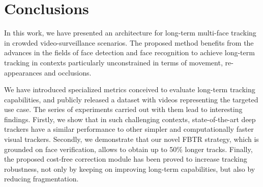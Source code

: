 \section{Conclusions}

In this work, we have presented an architecture for long-term multi-face tracking in crowded video-surveillance scenarios. The proposed method benefits from the advances in the fields of face detection and face recognition to achieve long-term tracking in contexts particularly unconstrained in terms of movement, re-appearances and occlusions. 

We have introduced specialized metrics conceived to evaluate long-term tracking capabilities, and publicly released a dataset with videos representing the targeted use case. The series of experiments carried out with them lead to interesting findings. Firstly, we show that in such challenging contexts, state-of-the-art deep trackers have a similar performance to other simpler and computationally faster visual trackers. Secondly, we demonstrate that our novel FBTR strategy, which is grounded on face verification, allows to obtain up to 50\% longer tracks. Finally, the proposed cost-free correction module has been proved to increase tracking robustness, not only by keeping on improving long-term capabilities, but also by reducing fragmentation.

